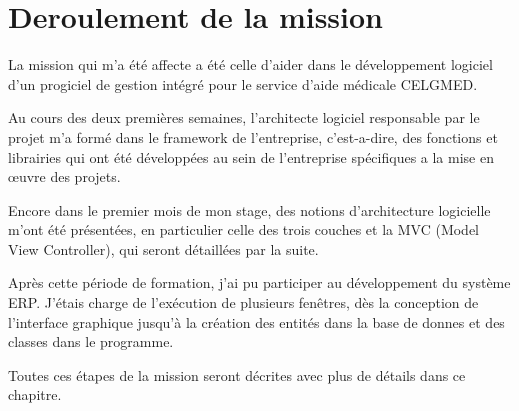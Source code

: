 \chapter{Deroulement de la mission}

La mission qui m'a été affecte a été celle d'aider dans le développement logiciel d'un progiciel de gestion intégré pour le service d'aide médicale CELGMED. 

Au cours des deux premières semaines, l'architecte logiciel responsable par le projet m'a formé dans le framework de l'entreprise, c'est-a-dire, des fonctions et librairies qui ont été développées au sein de l'entreprise spécifiques a la mise en œuvre des projets.

Encore dans le premier mois de mon stage, des notions d'architecture logicielle m'ont été présentées, en particulier celle des trois couches et la MVC (Model View Controller), qui seront détaillées par la suite.

Après cette période de formation, j'ai pu participer au développement du système \gls{ERP}. J'étais charge de l'exécution de plusieurs fenêtres, dès la conception de l'interface graphique jusqu'à la création des entités dans la base de donnes et des classes dans le programme.

Toutes ces étapes de la mission seront décrites avec plus de détails dans ce chapitre.  




